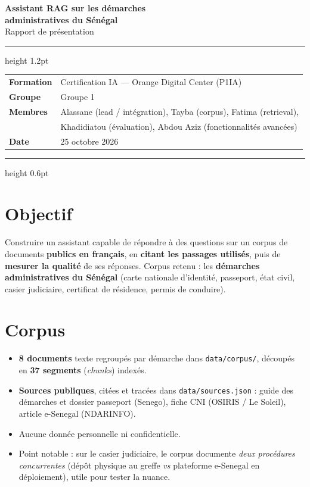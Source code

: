 \documentclass[11pt,a4paper]{article}
\begin{document}
\begin{flushleft}
{\color{navy}\bfseries\LARGE Assistant RAG sur les démarches\\[2pt] administratives du Sénégal}\\[6pt]
{\color{steel}\large Rapport de présentation}
\end{flushleft}
\vspace{2pt}
{\color{rulegray}\hrule height 1.2pt}
\vspace{6pt}
\begin{tabular}{@{}ll@{}}
\textbf{Formation} & Certification IA — Orange Digital Center (P1IA) \\
\textbf{Groupe} & Groupe 1 \\
\textbf{Membres} & Alassane (lead / intégration), Tayba (corpus), Fatima (retrieval), \\
 & Khadidiatou (évaluation), Abdou Aziz (fonctionnalités avancées) \\
\textbf{Date} & 25 octobre 2026 \\
\end{tabular}
\vspace{4pt}
{\color{rulegray}\hrule height 0.6pt}
\vspace{8pt}

\section{Objectif}
Construire un assistant capable de répondre à des questions sur un corpus de documents
\textbf{publics en français}, en \textbf{citant les passages utilisés}, puis de
\textbf{mesurer la qualité} de ses réponses. Corpus retenu : les \textbf{démarches
administratives du Sénégal} (carte nationale d'identité, passeport, état civil, casier
judiciaire, certificat de résidence, permis de conduire).

\section{Corpus}
\begin{itemize}
  \item \textbf{8 documents} texte regroupés par démarche dans \texttt{data/corpus/}, découpés en \textbf{37 segments} (\emph{chunks}) indexés.
  \item \textbf{Sources publiques}, citées et tracées dans \texttt{data/sources.json} : guide des démarches et dossier passeport (Senego), fiche CNI (OSIRIS / Le Soleil), article e-Senegal (NDARINFO).
  \item Aucune donnée personnelle ni confidentielle.
  \item Point notable : sur le casier judiciaire, le corpus documente \emph{deux procédures concurrentes} (dépôt physique au greffe \emph{vs} plateforme e-Senegal en déploiement), utile pour tester la nuance.
\end{itemize}
\end{document}
